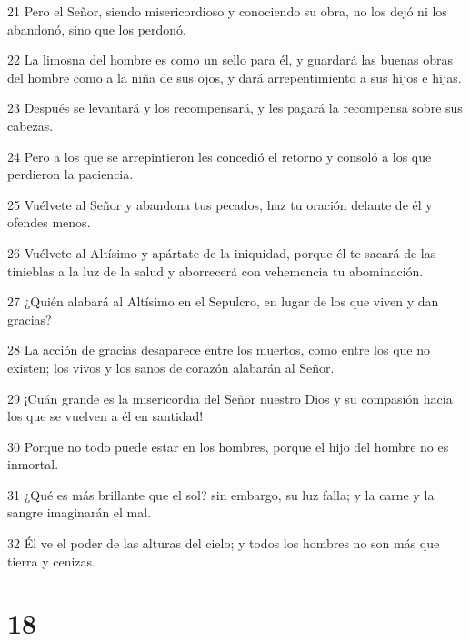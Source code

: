 \par 21 Pero el Señor, siendo misericordioso y conociendo su obra, no los dejó ni los abandonó, sino que los perdonó.
\par 22 La limosna del hombre es como un sello para él, y guardará las buenas obras del hombre como a la niña de sus ojos, y dará arrepentimiento a sus hijos e hijas.
\par 23 Después se levantará y los recompensará, y les pagará la recompensa sobre sus cabezas.
\par 24 Pero a los que se arrepintieron les concedió el retorno y consoló a los que perdieron la paciencia.
\par 25 Vuélvete al Señor y abandona tus pecados, haz tu oración delante de él y ofendes menos.
\par 26 Vuélvete al Altísimo y apártate de la iniquidad, porque él te sacará de las tinieblas a la luz de la salud y aborrecerá con vehemencia tu abominación.
\par 27 ¿Quién alabará al Altísimo en el Sepulcro, en lugar de los que viven y dan gracias?
\par 28 La acción de gracias desaparece entre los muertos, como entre los que no existen; los vivos y los sanos de corazón alabarán al Señor.
\par 29 ¡Cuán grande es la misericordia del Señor nuestro Dios y su compasión hacia los que se vuelven a él en santidad!
\par 30 Porque no todo puede estar en los hombres, porque el hijo del hombre no es inmortal.
\par 31 ¿Qué es más brillante que el sol? sin embargo, su luz falla; y la carne y la sangre imaginarán el mal.
\par 32 Él ve el poder de las alturas del cielo; y todos los hombres no son más que tierra y cenizas.

\chapter{18}

